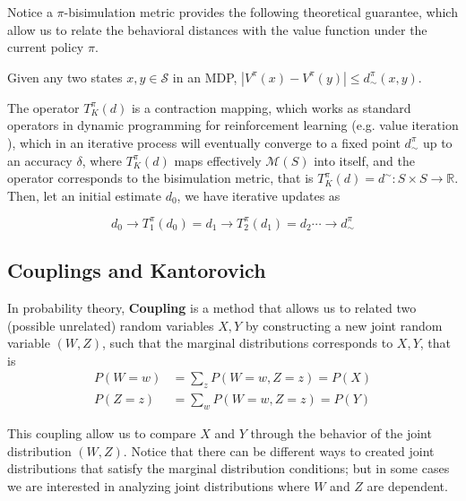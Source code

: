 Notice a $\pi$-bisimulation metric provides the following theoretical guarantee, which allow us to relate the behavioral distances with the value function under the current policy $\pi$.
\begin{definition}
 Given any two states $x, y \in \mathcal{S}$ in an MDP, $|V^\pi(x) - V^\pi(y)| \leq d^\pi_\sim(x, y)$.   
\end{definition}

The operator $T^\pi_K(d)$ is a contraction mapping, which works as standard operators in dynamic programming for reinforcement learning (e.g. value iteration \cite{sutton1988learning, sutton2018reinforcement}), which in an iterative process will eventually converge to a fixed point $d^\pi_\sim$ up to an accuracy $\delta$, where $T^\pi_K(d)$ maps effectively $\mathcal{M}(S)$ into itself, and the operator corresponds to the bisimulation metric, that is $T^\pi_K(d) = d^\sim : S \times S \rightarrow \mathbb{R}$. Then, let an initial estimate $d_0$, we have iterative updates as

$$d_0 \rightarrow T^\pi_1(d_0) = d_1 \rightarrow T^\pi_2(d_1) = d_2 \cdots \rightarrow d^\pi_\sim$$

\subsection{Couplings and Kantorovich}
\label{sec:coupling_kantorovich}

In probability theory, \textbf{Coupling} \cite{lindvall2002lectures} is a method that allows us to related two (possible unrelated) random variables $X, Y$ by constructing a new joint random variable $(W,Z)$, such that the marginal distributions corresponds to $X, Y$, that is
\begin{align}
    P(W = w) & = \sum_z P(W = w, Z = z) = P(X) \\
    P(Z = z) & = \sum_w P(W = w, Z = z) = P(Y)
\end{align}

This coupling allow us to compare $X$ and $Y$ through the behavior of the joint distribution $(W,Z)$. Notice that there can be different ways to created joint distributions that satisfy the marginal distribution conditions; but in some cases we are interested in analyzing joint distributions where $W$ and $Z$ are dependent.

